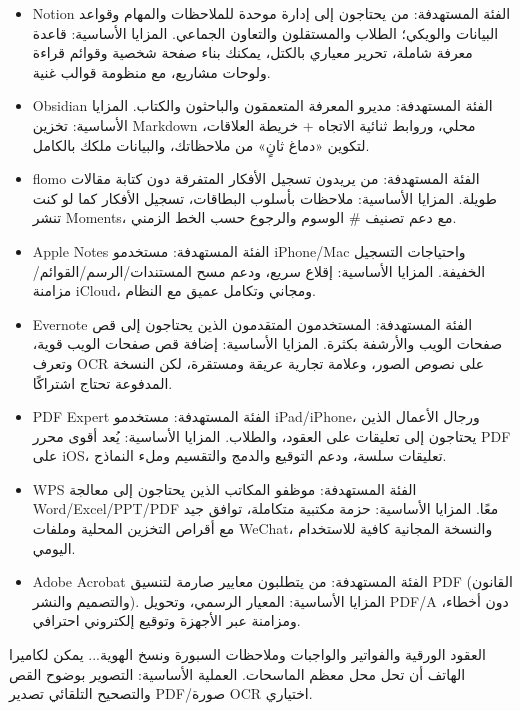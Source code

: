 \begin{itemize}
  \item Notion الفئة المستهدفة: من يحتاجون إلى إدارة موحدة للملاحظات والمهام وقواعد البيانات والويكي؛ الطلاب والمستقلون والتعاون الجماعي. المزايا الأساسية: قاعدة معرفة شاملة، تحرير معياري بالكتل، يمكنك بناء صفحة شخصية وقوائم قراءة ولوحات مشاريع، مع منظومة قوالب غنية.
  \item Obsidian الفئة المستهدفة: مديرو المعرفة المتعمقون والباحثون والكتاب. المزايا الأساسية: تخزين Markdown محلي، وروابط ثنائية الاتجاه + خريطة العلاقات، لتكوين «دماغ ثانٍ» من ملاحظاتك، والبيانات ملكك بالكامل.
  \item flomo الفئة المستهدفة: من يريدون تسجيل الأفكار المتفرقة دون كتابة مقالات طويلة. المزايا الأساسية: ملاحظات بأسلوب البطاقات، تسجيل الأفكار كما لو كنت تنشر Moments، مع دعم تصنيف \# الوسوم والرجوع حسب الخط الزمني.
  \item Apple Notes الفئة المستهدفة: مستخدمو iPhone/Mac واحتياجات التسجيل الخفيفة. المزايا الأساسية: إقلاع سريع، ودعم مسح المستندات/الرسم/القوائم/مزامنة iCloud، ومجاني وتكامل عميق مع النظام.
  \item Evernote الفئة المستهدفة: المستخدمون المتقدمون الذين يحتاجون إلى قص صفحات الويب والأرشفة بكثرة. المزايا الأساسية: إضافة قص صفحات الويب قوية، وتعرف OCR على نصوص الصور، وعلامة تجارية عريقة ومستقرة، لكن النسخة المدفوعة تحتاج اشتراكًا.
\end{itemize}


\begin{itemize}
  \item PDF Expert الفئة المستهدفة: مستخدمو iPad/iPhone، ورجال الأعمال الذين يحتاجون إلى تعليقات على العقود، والطلاب. المزايا الأساسية: يُعد أقوى محرر PDF على iOS، تعليقات سلسة، ودعم التوقيع والدمج والتقسيم وملء النماذج.
  \item WPS الفئة المستهدفة: موظفو المكاتب الذين يحتاجون إلى معالجة Word/Excel/PPT/PDF معًا. المزايا الأساسية: حزمة مكتبية متكاملة، توافق جيد مع أقراص التخزين المحلية وملفات WeChat، والنسخة المجانية كافية للاستخدام اليومي.
  \item Adobe Acrobat الفئة المستهدفة: من يتطلبون معايير صارمة لتنسيق PDF (القانون والتصميم والنشر). المزايا الأساسية: المعيار الرسمي، وتحويل PDF/A دون أخطاء، ومزامنة عبر الأجهزة وتوقيع إلكتروني احترافي.
\end{itemize}


العقود الورقية والفواتير والواجبات وملاحظات السبورة ونسخ الهوية... يمكن لكاميرا الهاتف أن تحل محل معظم الماسحات. العملية الأساسية: التصوير بوضوح القص والتصحيح التلقائي تصدير PDF/صورة OCR اختياري.

